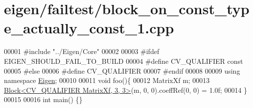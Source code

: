 \hypertarget{eigen_2failtest_2block__on__const__type__actually__const__1_8cpp_source}{}\section{eigen/failtest/block\+\_\+on\+\_\+const\+\_\+type\+\_\+actually\+\_\+const\+\_\+1.cpp}
\label{eigen_2failtest_2block__on__const__type__actually__const__1_8cpp_source}

\begin{DoxyCode}
00001 \textcolor{preprocessor}{#include "../Eigen/Core"}
00002 
00003 \textcolor{preprocessor}{#ifdef EIGEN\_SHOULD\_FAIL\_TO\_BUILD}
00004 \textcolor{preprocessor}{#define CV\_QUALIFIER const}
00005 \textcolor{preprocessor}{#else}
00006 \textcolor{preprocessor}{#define CV\_QUALIFIER}
00007 \textcolor{preprocessor}{#endif}
00008 
00009 \textcolor{keyword}{using namespace }\hyperlink{namespace_eigen}{Eigen};
00010 
00011 \textcolor{keywordtype}{void} foo()\{
00012     MatrixXf m;
00013     \hyperlink{group___core___module_class_eigen_1_1_block}{Block<CV\_QUALIFIER MatrixXf, 3, 3>}(m, 0, 0).coeffRef(0, 0) = 1.0f;
00014 \}
00015 
00016 \textcolor{keywordtype}{int} main() \{\}
\end{DoxyCode}
